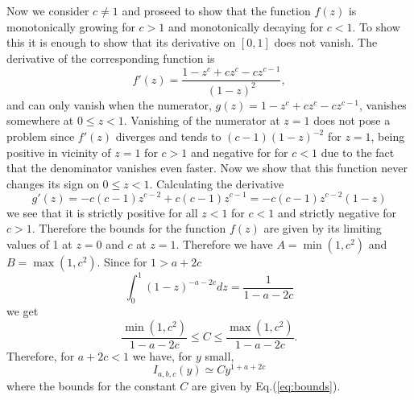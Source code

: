 Now we consider $c \neq 1$ and proseed to show that the 
function $f(z)$ is monotonically growing for $c>1$ and monotonically decaying for $c<1$. To show this it is enough to show that its derivative 
on $[0,1]$ does not vanish. The derivative of the corresponding function is 
\[
 f'(z)=\frac{1-z^c+cz^c-cz^{c-1}}{(1-z)^2},
\]
and can only vanish when the numerator, $g(z)= 1-z^c+cz^c-cz^{c-1}$, vanishes somewhere at $0\leq z < 1$. Vanishing of the numerator at $z=1$ does not pose a problem since $f'(z)$ diverges and tends to $(c-1)(1-z)^{-2}$ for $z=1$, 
being positive in vicinity of $z=1$ for $c>1$ and negative for for $c < 1$ due to the fact that the denominator vanishes even faster.
Now we show that this function never changes its sign on $0\leq z < 1$.
Calculating the derivative 
\[
 g'(z)=- c(c-1)z^{c-2} + c(c-1)z^{c-1} = - c(c-1)z^{c-2}(1-z)
\]
we see that it is strictly positive for all $z<1$ for $c<1$ and strictly negative for $c>1$. Therefore the bounds for the function $f(z)$ are 
given by its limiting values of 1 at $z=0$ and $c$ at $z = 1$. Therefore we have $A=\min(1,c^2)$ and $B=\max(1,c^2)$. 
Since for $1>a+2c $
\[
 \int_0^1 (1-z)^{-a-2c} dz = \frac{1}{1-a-2c}
\]
we get 
\begin{equation}
\frac{\min(1,c^2)}{1-a-2c} \leq C \leq \frac{\max(1,c^2)}{1-a-2c}. \label{eq:bounds}
\end{equation}
Therefore, for  $a+2c < 1$ we have, for $y$ small, 
\begin{equation}
I_{a,b,c }(y) \simeq C y^{1+a+2c}
\label{eq:I1A}
\end{equation}  
where the bounds for the constant $C$ are given by Eq.(\ref{eq:bounds}).


